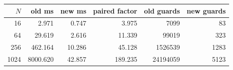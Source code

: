 \begin{center}
\small
\begin{tabular}{rrrrrr}
\toprule
$N$ & old ms & new ms & paired factor & old guards & new guards\\
\midrule
16 & 2.971 & 0.747 & 3.975 & 7099 & 83\\
64 & 29.619 & 2.616 & 11.339 & 99019 & 323\\
256 & 462.164 & 10.286 & 45.128 & 1526539 & 1283\\
1024 & 8000.620 & 42.857 & 189.235 & 24194059 & 5123\\
\bottomrule
\end{tabular}
\end{center}
